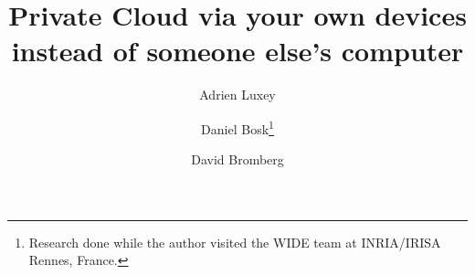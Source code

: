 \title{%
  Private Cloud via your own devices instead of someone else's computer
}
\author[1]{Adrien Luxey}
\author[2]{Daniel Bosk\thanks{%
    Research done while the author visited the WIDE team at INRIA/IRISA Rennes, 
    France.
  }}
\author[1]{David Bromberg}


\mode*

\begin{abstract}
  
\end{abstract}







\begin{frame}[allowframebreaks]
  \printbibliography{}
\end{frame}
